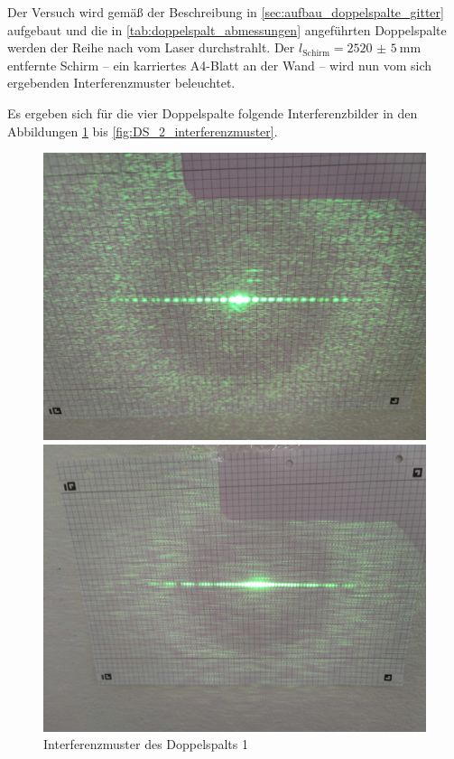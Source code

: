 \documentclass[ngerman]{scrartcl}
\begin{document}
Der Versuch wird gemäß der Beschreibung in \autoref{sec:aufbau_doppelspalte_gitter} aufgebaut und die in \autoref{tab:doppelspalt_abmessungen} angeführten Doppelspalte werden der Reihe nach vom Laser durchstrahlt. Der $l_\text{Schirm} = \SI{2520(5)}{\milli\meter}$ entfernte Schirm -- ein karriertes A4-Blatt an der Wand -- wird nun vom sich ergebenden Interferenzmuster beleuchtet.

Es ergeben sich für die vier Doppelspalte folgende Interferenzbilder in den Abbildungen \ref{fig:DS_1_interferenzmuster} bis \ref{fig:DS_2_interferenzmuster}.
%
\setcapindent{0pt}
\begin{figure}[H]
    \centering
    \begin{minipage}[t]{0.45\linewidth}
        \centering
        \includegraphics[width=\linewidth]{fig/Compressed/DS1_0_20_25.jpg}
        \caption{Interferenzmuster des Doppelspalts 1}
        \label{fig:DS_1_interferenzmuster}
        \includegraphics[width=\linewidth]{fig/Compressed/DS3_0_10_5.jpg}

\end{minipage}
\end{figure}
\end{document}

